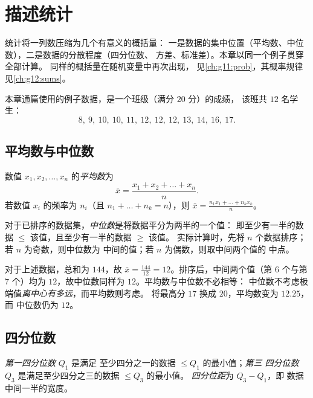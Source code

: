 \chapter{描述统计}\label{ch:g11:stat}

统计将一列数压缩为几个有意义的概括量：
一是数据的集中位置（平均数、中位数），二是数据的分散程度（四分位数、
方差、标准差）。本章以同一个例子贯穿全部计算。
同样的概括量在随机变量中再次出现，
见\cref{ch:g11:prob}，其概率规律见\cref{ch:g12:sums}。

本章通篇使用的例子数据，是一个班级（满分 $20$ 分）的成绩，
该班共 $12$ 名学生：
\[
8,\ 9,\ 10,\ 10,\ 11,\ 12,\ 12,\ 12,\ 13,\ 14,\ 16,\ 17 .
\]

\section{平均数与中位数}

\begin{definition}[平均数]\label{def:g11:stat:mean}
数值 $x_1, x_2, \dots, x_n$ 的\emph{平均数}为
\[
\bar x = \frac{x_1 + x_2 + \dots + x_n}{n}.
\]
若数值 $x_i$ 的频率为 $n_i$（且
$n_1 + \dots + n_k = n$），则
$\bar x = \frac{n_1 x_1 + \dots + n_k x_k}{n}$。
\end{definition}

\begin{definition}[中位数]\label{def:g11:stat:median}
对于已排序的数据集，\emph{中位数}是将数据平分为两半的一个值：
即至少有一半的数据 $\leq$ 该值，且至少有一半的数据 $\geq$ 该值。
实际计算时，先将 $n$ 个数据排序；若 $n$ 为奇数，则中位数为
中间的值；若 $n$ 为偶数，则取中间两个值的
中点。
\end{definition}

\begin{example}\label{ex:g11:stat:meanmedian}
对于上述数据，总和为 $144$，故 $\bar x = \frac{144}{12} =
12$。排序后，中间两个值（第 $6$ 个与第 $7$ 个）均为
$12$，故中位数同样为 $12$。平均数与中位数不必相等：
中位数不考虑极端值\emph{离中心有多远}，而平均数则考虑。
将最高分 $17$ 换成 $20$，平均数变为 $12.25$，而
中位数仍为 $12$。
\end{example}

\section{四分位数}

\begin{definition}\label{def:g11:stat:quartiles}
\emph{第一四分位数} $Q_1$ 是满足
至少四分之一的数据 $\leq Q_1$ 的最小值；\emph{第三
四分位数} $Q_3$ 是满足至少四分之三的数据 $\leq Q_3$ 的最小值。
\emph{四分位距}为 $Q_3 - Q_1$，即
数据中间一半的宽度。
\end{definition}

